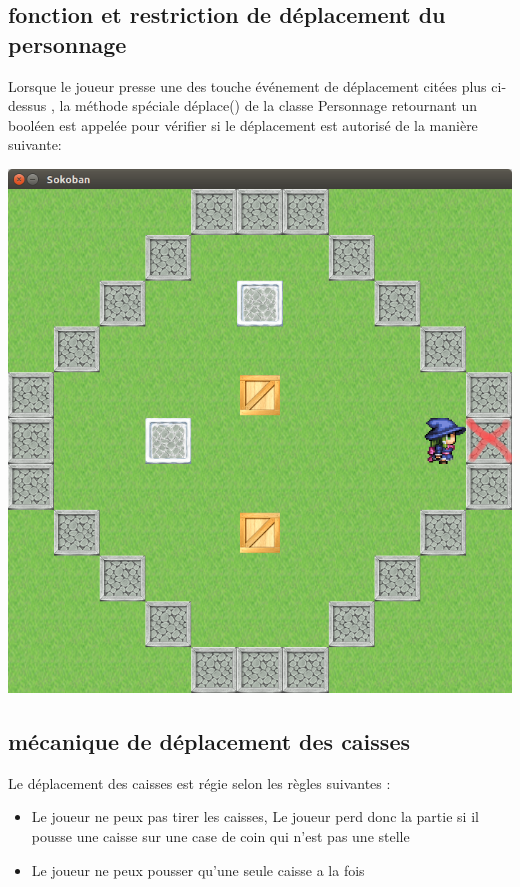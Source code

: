\documentclass{article}
\begin{document}
		\subsection{fonction et restriction de déplacement du personnage}		
		Lorsque le joueur presse une des touche événement de déplacement citées plus ci-dessus , la méthode spéciale déplace() de la classe Personnage retournant un booléen est appelée pour vérifier si le déplacement est autorisé de la manière suivante:
	\vspace{0.5cm}
	\begin{center}

			\includegraphics[scale=0.25]{../Screenshots/01.png}
				
	\end{center}
		\subsection{mécanique de déplacement des caisses}
			Le déplacement des caisses est régie selon les règles suivantes : 
			\begin{itemize}
				
				\item Le joueur ne peux pas tirer les caisses, Le joueur perd donc la partie si il pousse une caisse sur une case de coin qui n'est pas une stelle
				\item Le joueur ne peux pousser qu'une seule caisse a la fois 
				
				\end{itemize}
				
\end{document}
